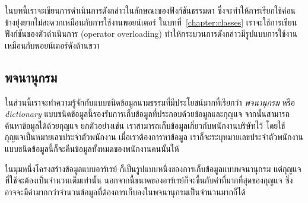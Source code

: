 ใน{\wbr}บท{\wbr}นี้{\wbr}เรา{\wbr}จะ{\wbr}เขียน{\wbr}การ{\wbr}ดำเนินการ{\wbr}ดังกล่าว{\wbr}ใน{\wbr}ลักษณะ{\wbr}ของ{\wbr}ฟังก์ชัน{\wbr}ธรรมดา{\wbr}
ซึ่ง{\wbr}จะ{\wbr}ทำ{\wbr}ให้การ{\wbr}เรียก{\wbr}ใช้{\wbr}ค่อนข้าง{\wbr}ยุ่งยาก{\wbr}ไม่{\wbr}สะดวก{\wbr}เหมือน{\wbr}กับ{\wbr}การ{\wbr}ใช้{\wbr}งาน{\wbr}พอยน์เตอร์
ใน{\wbr}บท{\wbr}ที่~\ref{chapter:classes} เรา{\wbr}จะ{\wbr}ใช้{\wbr}การ{\wbr}เขียน{\wbr}ฟังก์ชัน{\wbr}ของ{\wbr}ตัวดำเนินการ (operator
overloading) ทำ{\wbr}ให้{\wbr}กระบวนการ{\wbr}ดังกล่าว{\wbr}มี{\wbr}รูปแบบ{\wbr}การ{\wbr}ใช้{\wbr}งาน{\wbr}เหมือน{\wbr}กับ{\wbr}พอยน์เตอร์{\wbr}ดัง{\wbr}ด้าน{\wbr}ขวา{\wbr}

\subsection{พจนานุกรม}
ใน{\wbr}ส่วน{\wbr}นี้{\wbr}เรา{\wbr}จะ{\wbr}ทำ{\wbr}ความ{\wbr}รู้จัก{\wbr}กับ{\wbr}แบบ{\wbr}ชนิด{\wbr}ข้อมูล{\wbr}นามธรรม{\wbr}ที่{\wbr}มี{\wbr}ประโยชน์{\wbr}มาก{\wbr}ที่{\wbr}เรียก{\wbr}ว่า {\em
  พจนานุกรม} หรือ {\em dictionary}
แบบ{\wbr}ชนิด{\wbr}ข้อมูล{\wbr}นี้{\wbr}รองรับ{\wbr}การ{\wbr}เก็บ{\wbr}ข้อมูล{\wbr}ที่{\wbr}ประกอบ{\wbr}ด้วย{\wbr}ข้อมูล{\wbr}และ{\wbr}กุญแจ{\wbr}
จากนั้น{\wbr}สามารถ{\wbr}ค้นหา{\wbr}ข้อมูล{\wbr}ได้{\wbr}ด้วย{\wbr}กุญแจ ยก{\wbr}ตัวอย่าง{\wbr}เช่น{\wbr}
เรา{\wbr}สามารถ{\wbr}เก็บ{\wbr}ข้อมูล{\wbr}เกี่ยวกับ{\wbr}พนักงาน{\wbr}บริษัท{\wbr}ไว้ โดย{\wbr}ใช้{\wbr}กุญแจ{\wbr}เป็น{\wbr}หมายเลข{\wbr}ประจำตัว{\wbr}พนักงาน{\wbr}
เมื่อ{\wbr}เรา{\wbr}ต้องการ{\wbr}หา{\wbr}ข้อมูล เรา{\wbr}ก็{\wbr}จะ{\wbr}ระบุ{\wbr}หมายเลข{\wbr}ประจำตัว{\wbr}พนักงาน{\wbr}
แบบ{\wbr}ชนิด{\wbr}ข้อมูล{\wbr}นี้{\wbr}ก็{\wbr}จะ{\wbr}คืน{\wbr}ข้อมูล{\wbr}ทั้งหมด{\wbr}ของ{\wbr}พนักงาน{\wbr}คน{\wbr}นั้น{\wbr}ให้{\wbr}

ใน{\wbr}มุม{\wbr}หนึ่ง{\wbr}โครงสร้าง{\wbr}ข้อมูล{\wbr}แบบ{\wbr}อาร์เรย์ ก็{\wbr}เป็น{\wbr}รูปแบบ{\wbr}หนึ่ง{\wbr}ของ{\wbr}การ{\wbr}เก็บ{\wbr}ข้อมูล{\wbr}แบบ{\wbr}พจนานุกรม{\wbr}
แต่{\wbr}กุญแจ{\wbr}ที่{\wbr}ใช้{\wbr}จะ{\wbr}ต้อง{\wbr}เป็น{\wbr}จำนวนเต็ม{\wbr}เท่านั้น{\wbr}
นอกจากนี้{\wbr}ขนาด{\wbr}ของ{\wbr}อาร์เรย์{\wbr}ก็{\wbr}จะ{\wbr}ขึ้น{\wbr}กับ{\wbr}ค่า{\wbr}ที่{\wbr}มาก{\wbr}ที่สุด{\wbr}ของ{\wbr}กุญแจ{\wbr}
ซึ่ง{\wbr}อาจ{\wbr}จะ{\wbr}มี{\wbr}ค่า{\wbr}มาก{\wbr}กว่า{\wbr}จำนวน{\wbr}ข้อมูล{\wbr}ที่{\wbr}ต้องการ{\wbr}เก็บ{\wbr}ลง{\wbr}ใน{\wbr}พจนานุกรม{\wbr}เป็น{\wbr}จำนวน{\wbr}มาก{\wbr}ก็ได้{\wbr}

